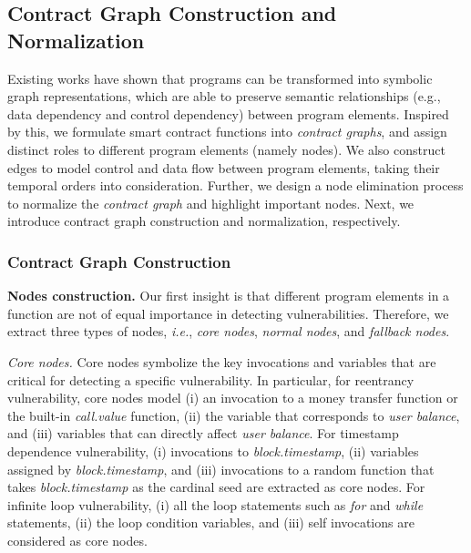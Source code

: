 \vspace{-0.7em}
\subsection{Contract Graph Construction and Normalization}
\label{graph_representation}
Existing works \cite{Miltiadis,rossi2018deep} have shown that programs can be transformed into symbolic graph representations, which are able to preserve semantic relationships (e.g., data dependency and control dependency) between program elements. Inspired by this, we formulate smart contract functions into \emph{contract graphs}, and assign distinct roles to different program elements (namely nodes). We also construct edges to model control and data flow between program elements, taking their temporal orders into consideration. Further, we design a node elimination process to normalize the \emph{contract graph} and highlight important nodes. Next, we introduce contract graph construction and normalization, respectively.

\vspace{-0.7em}
\subsubsection{Contract Graph Construction}
\label{nodes_and_edges}
\textbf{Nodes construction.} Our first insight is that different program elements in a function are not of equal importance in detecting vulnerabilities. Therefore, we extract three types of nodes, \emph{i.e.}, \textit{core nodes}, \textit{normal nodes}, and \textit{fallback nodes}.

\textit{Core nodes.} Core nodes symbolize the key invocations and variables that are critical for detecting a specific vulnerability. In particular, for reentrancy vulnerability, core nodes model (i) an invocation to a money transfer function or the built-in \emph{call.value} function, (ii) the  variable that corresponds to \emph{user balance}, and (iii) variables that can directly affect \emph{user balance}. For timestamp dependence vulnerability,  (i) invocations to \textit{block.timestamp}, (ii) variables assigned by \textit{block.timestamp}, and (iii) invocations to a random function that takes \textit{block.timestamp} as the cardinal seed are extracted as core nodes. For infinite loop vulnerability, (i) all the loop statements such as \emph{for} and \emph{while} statements, (ii) the loop condition variables, and (iii)  self invocations are considered as core nodes.

